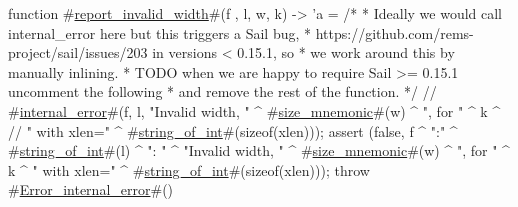 function #\hyperref[sailRISCVzreportzyinvalidzywidth]{report\_invalid\_width}#(f , l, w, k) -> 'a = {
  /*
   * Ideally we would call internal_error here but this triggers a Sail bug,
   * https://github.com/rems-project/sail/issues/203 in versions < 0.15.1, so
   * we work around this by manually inlining.
   * TODO when we are happy to require Sail >= 0.15.1 uncomment the following
   * and remove the rest of the function.
   */
  // #\hyperref[sailRISCVzinternalzyerror]{internal\_error}#(f, l, "Invalid width, " ^ #\hyperref[sailRISCVzsizzezymnemonic]{size\_mnemonic}#(w) ^ ", for " ^ k ^
  //   " with xlen=" ^ #\hyperref[sailRISCVzstringzyofzyint]{string\_of\_int}#(sizeof(xlen)));
  assert (false, f ^ ":" ^ #\hyperref[sailRISCVzstringzyofzyint]{string\_of\_int}#(l) ^ ": " ^ "Invalid width, "
    ^ #\hyperref[sailRISCVzsizzezymnemonic]{size\_mnemonic}#(w) ^ ", for " ^ k ^ " with xlen="
    ^ #\hyperref[sailRISCVzstringzyofzyint]{string\_of\_int}#(sizeof(xlen)));
  throw #\hyperref[sailRISCVzErrorzyinternalzyerror]{Error\_internal\_error}#()
}
